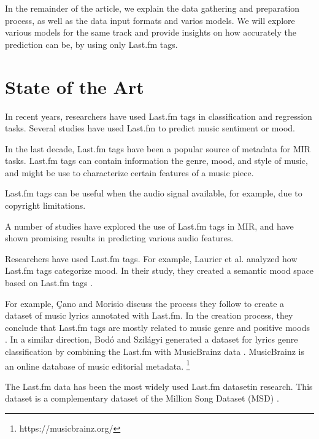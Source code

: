 \documentclass[sn-mathphys]{sn-jnl}%
\theoremstyle{thmstyleone}%
\theoremstyle{thmstyletwo}%
\theoremstyle{thmstylethree}%
\begin{document}
In the remainder of the article, we explain the data gathering and preparation process, as well as the data input formats and varios models.
We will explore various models for the same track and provide insights on how accurately the prediction can be, by using only Last.fm tags.

\section{State of the Art}

In recent years, researchers have used Last.fm tags in classification and regression tasks.
Several studies have used Last.fm to predict music sentiment or mood.



In the last decade, Last.fm tags have been a popular source of metadata for MIR tasks.
Last.fm tags can contain information the genre, mood, and style of music,
and might be use to characterize certain features of a music piece.


Last.fm tags can be useful when the audio signal available,
for example, due to copyright limitations.

A number of studies have explored the use of Last.fm tags in MIR,
and have shown promising results in predicting various audio features.

Researchers have used Last.fm tags.
For example, Laurier et al. analyzed how Last.fm tags categorize mood.
In their study, they created a semantic mood space based on Last.fm tags \cite{laurier2009music}.

For example, {\c{C}}ano and Morisio discuss the process they follow to create a dataset of music
lyrics annotated with Last.fm.
In the creation process, they conclude that Last.fm tags are mostly related to music genre
and positive moods \cite{ccano2017music}.
In a similar direction, Bod{\'o} and Szil{\'a}gyi generated a dataset for lyrics genre classification
by combining the Last.fm with MusicBrainz data \cite{bodo2018connecting}.
MusicBrainz \footnotemark[1] is an online database of music editorial metadata.
\footnote[1]{https://musicbrainz.org/}

The Last.fm data has been the most widely used Last.fm dataset\footnotemark[2] in research.
This dataset is a complementary dataset of the Million Song Dataset (MSD) \cite{Bertin-Mahieux2011}.
\end{document}
